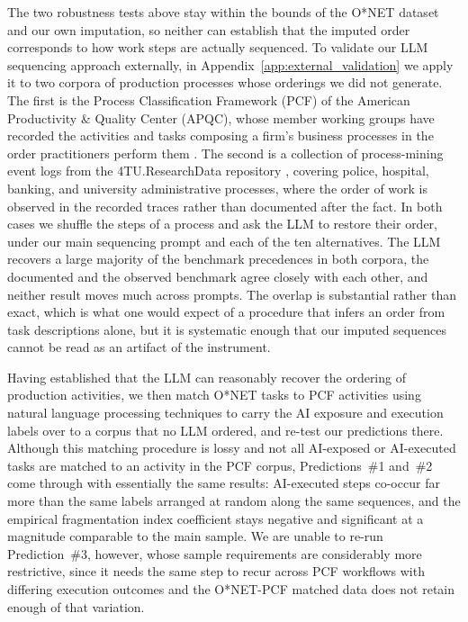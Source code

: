 The two robustness tests above stay within the bounds of the O*NET dataset and our own imputation, so neither can establish that the imputed order corresponds to how work steps are actually sequenced.
To validate our LLM sequencing approach externally, in Appendix~\ref{app:external_validation} we apply it to two corpora of production processes whose orderings we did not generate.
The first is the Process Classification Framework (PCF) of the American Productivity \& Quality Center (APQC), whose member working groups have recorded the activities and tasks composing a firm's business processes in the order practitioners perform them \citep{apqc_pcf}.
The second is a collection of process-mining event logs from the 4TU.ResearchData repository \citep{roadfines_log, sepsis_log, bpi2017_log, bpi2020_log}, covering police, hospital, banking, and university administrative processes, where the order of work is observed in the recorded traces rather than documented after the fact.
In both cases we shuffle the steps of a process and ask the LLM to restore their order, under our main sequencing prompt and each of the ten alternatives.
The LLM recovers a large majority of the benchmark precedences in both corpora, the documented and the observed benchmark agree closely with each other, and neither result moves much across prompts.
The overlap is substantial rather than exact, which is what one would expect of a procedure that infers an order from task descriptions alone, but it is systematic enough that our imputed sequences cannot be read as an artifact of the instrument.

Having established that the LLM can reasonably recover the ordering of production activities, we then match O*NET tasks to PCF activities using natural language processing techniques to carry the AI exposure and execution labels over to a corpus that no LLM ordered, and re-test our predictions there.
Although this matching procedure is lossy and not all AI-exposed or AI-executed tasks are matched to an activity in the PCF corpus, Predictions~\#1 and~\#2 come through with essentially the same results: AI-executed steps co-occur far more than the same labels arranged at random along the same sequences, and the empirical fragmentation index coefficient stays negative and significant at a magnitude comparable to the main sample.
We are unable to re-run Prediction~\#3, however, whose sample requirements are considerably more restrictive, since it needs the same step to recur across PCF workflows with differing execution outcomes and the O*NET-PCF matched data does not retain enough of that variation.